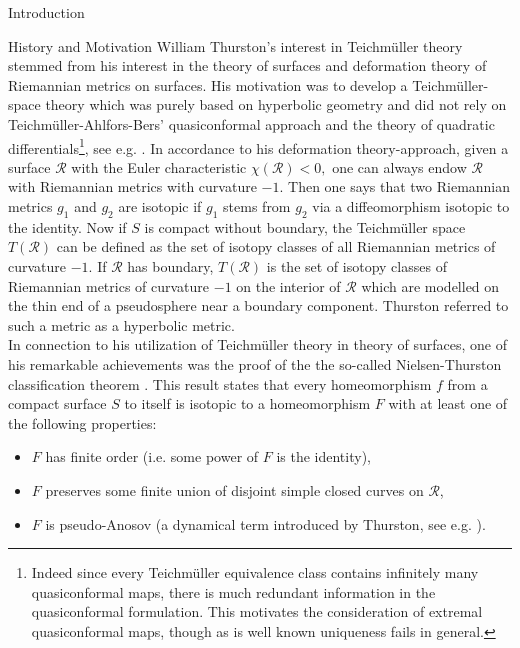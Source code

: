 \documentclass[12pt]{amsart}
\theoremstyle{plain}
\theoremstyle{definition}
\theoremstyle{remark}
\numberwithin{equation}{section} %
\numberwithin{figure}{section} %
\begin{document}
\begin{section}{Introduction}
\begin{subsection}{History and Motivation}
William Thurston's interest in Teichm\"uller theory stemmed from his interest in the theory of surfaces and deformation theory of Riemannian metrics on surfaces. His motivation was to develop a Teichm\"uller-space theory which was purely based on hyperbolic geometry and did not rely on Teichm\"uller-Ahlfors-Bers' quasiconformal approach and the theory of quadratic differentials\footnote{Indeed since every Teichm\"uller equivalence class contains infinitely many quasiconformal maps, there is much redundant information in the quasiconformal formulation. This motivates the consideration of extremal quasiconformal maps, though as is well known uniqueness fails in general.}, see e.g. \cite{Ohshikapapa}. In accordance to his deformation theory-approach, given a surface $\mathscr{R}$ with the Euler characteristic $\chi(\mathscr{R}) < 0,$ one can always endow $\mathscr{R}$ with Riemannian metrics with curvature $-1.$ Then one says that two Riemannian metrics $g_1$ and $g_2$ are isotopic if $g_1$ stems from $g_2$ via a diffeomorphism isotopic to the identity. Now if $S$ is compact without boundary, the Teichm\"uller space $T(\mathscr{R})$ can be defined as the set of isotopy classes of all Riemannian metrics of curvature $-1$. If $\mathscr{R}$ has boundary, $T(\mathscr{R})$ is the set of isotopy classes of Riemannian metrics of curvature $-1$ on the interior of $\mathscr{R}$ which are modelled on the thin end of a pseudosphere near a boundary component. Thurston referred to such a metric as a hyperbolic metric.\\ 

In connection to his utilization of Teichm\"uller theory in theory of surfaces, one of his remarkable achievements was the proof of the the so-called Nielsen-Thurston classification theorem \cite{Thur2}. This result states that every homeomorphism $f$ from  a compact surface $S$ to itself is isotopic to a homeomorphism $F$ with at least one of the following properties:
\begin{itemize}
    \item $F$ has finite order (i.e. some power of $F$ is the identity),
    \item $F$ preserves some finite union of disjoint simple closed curves on $\mathscr{R}$,
    \item $F$ is pseudo-Anosov (a dynamical term introduced by Thurston, see e.g. \cite {Thur2}).
\end{itemize}


\end{subsection}
\end{section}
\end{document}
